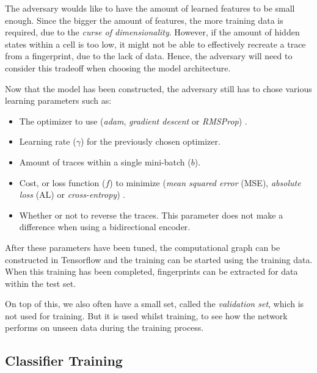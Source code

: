 The adversary woulds like to have the amount of learned features to be small enough.
Since the bigger the amount of features, the more training data is required, due to the \textit{curse of dimensionality}.
However, if the amount of hidden states within a cell is too low, it might not be able to effectively recreate a trace from a fingerprint, due to the lack of data.
Hence, the adversary will need to consider this tradeoff when choosing the model architecture.

Now that the model has been constructed, the adversary still has to chose various learning parameters such as:

\begin{itemize}
  \item The optimizer to use (\textit{adam}, \textit{gradient descent} or \textit{RMSProp}) \cite{tensorflow}.
  \item Learning rate ($\gamma$) for the previously chosen optimizer.
  \item Amount of traces within a single mini-batch ($b$).
  \item Cost, or loss function ($f$) to minimize (\textit{mean squared error} (MSE), \textit{absolute loss} (AL) or \textit{cross-entropy}) \cite{tensorflow}.
  \item Whether or not to reverse the traces. This parameter does not make a difference when using a bidirectional encoder.
\end{itemize}

After these parameters have been tuned, the computational graph can be constructed in Tensorflow and the training can be started using the training data.
When this training has been completed, fingerprints can be extracted for data within the test set.

On top of this, we also often have a small set, called the \textit{validation set}, which is not used for training.
But it is used whilst training, to see how the network performs on unseen data during the training process.

\subsection{Classifier Training} \label{sec:classifier-training}

